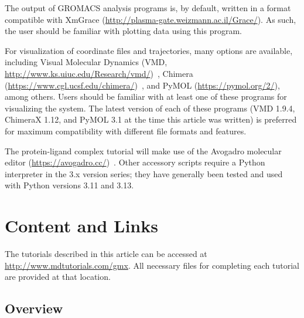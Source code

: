 \documentclass[9pt,tutorial,pubversion]{livecoms}
\newcommand{\urlstring}{http://www.mdtutorials.com/gmx}
\newcommand{\tutorialhomeurl}{\url{\urlstring}}
\begin{document}
The output of GROMACS analysis programs is, by default, written in a format compatible with XmGrace (\url{http://plasma-gate.weizmann.ac.il/Grace/}). As such, the user should be familiar with plotting data using this program.

For visualization of coordinate files and trajectories, many options are available, including Visual Molecular Dynamics (VMD, \url{http://www.ks.uiuc.edu/Research/vmd/})~\cite{Humphrey1996}, Chimera (\url{https://www.cgl.ucsf.edu/chimera/})~\cite{Petersen2004}, and PyMOL (\url{https://pymol.org/2/}), among others. Users should be familiar with at least one of these programs for visualizing the system. The latest version of each of these programs (VMD 1.9.4, ChimeraX 1.12, and PyMOL 3.1 at the time this article was written) is preferred for maximum compatibility with different file formats and features.

The protein-ligand complex tutorial will make use of the Avogadro molecular editor (\url{https://avogadro.cc/})~\cite{Hanwell2012}. Other accessory scripts require a Python interpreter in the 3.x version series; they have generally been tested and used with Python versions 3.11 and 3.13.

\section{Content and Links}


The tutorials described in this article can be accessed at \tutorialhomeurl. All necessary files for completing each tutorial are provided at that location.

\subsection{Overview}
\end{document}
